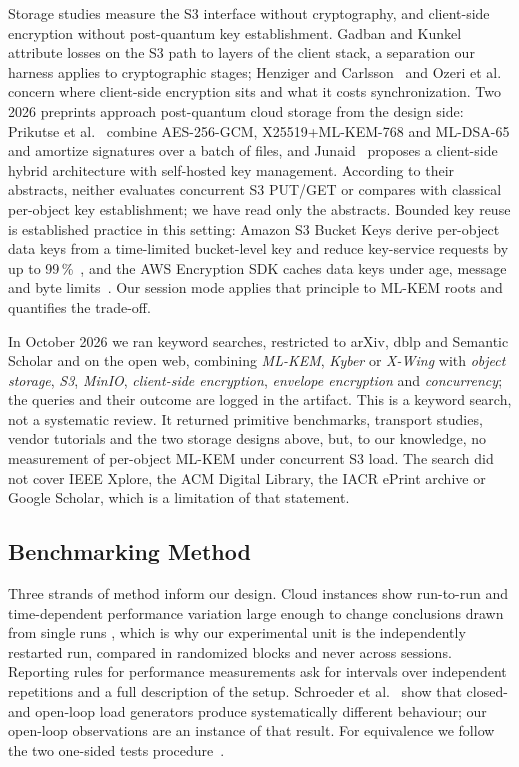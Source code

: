 \documentclass[conference]{IEEEtran}
\begin{document}
Storage studies measure the S3 interface without cryptography, and client-side encryption
without post-quantum key establishment. Gadban and Kunkel~\cite{gadban2021} attribute losses on
the S3 path to layers of the client stack, a separation our harness applies to cryptographic
stages; Henziger and Carlsson~\cite{henziger2019} and Ozeri et al.~\cite{ozeri2023} concern
where client-side encryption sits and what it costs synchronization. Two 2026 preprints
approach post-quantum cloud storage from the design side: Prikutse et
al.~\cite{prikutse2026} combine AES-256-GCM, X25519+ML-KEM-768 and ML-DSA-65 and amortize
signatures over a batch of files, and Junaid~\cite{junaid2026} proposes a client-side hybrid
architecture with self-hosted key management. According to their abstracts, neither evaluates
concurrent S3 PUT/GET or compares with classical per-object key establishment; we have read only
the abstracts. Bounded key reuse is established practice in this setting: Amazon S3 Bucket Keys
derive per-object data keys from a time-limited bucket-level key and reduce key-service requests
by up to 99\,\%~\cite{s3bucketkeys}, and the AWS Encryption SDK caches data keys under age,
message and byte limits~\cite{esdkcache}. Our session mode applies that principle to ML-KEM
roots and quantifies the trade-off.

In October 2026 we ran keyword searches, restricted to arXiv, dblp and Semantic Scholar and on
the open web, combining \emph{ML-KEM}, \emph{Kyber} or \emph{X-Wing} with \emph{object storage},
\emph{S3}, \emph{MinIO}, \emph{client-side encryption}, \emph{envelope encryption} and
\emph{concurrency}; the queries and their outcome are logged in the artifact. This is a keyword
search, not a systematic review. It returned primitive benchmarks, transport studies, vendor
tutorials and the two storage designs above, but, to our knowledge, no measurement of per-object
ML-KEM under concurrent S3 load. The search did not cover IEEE Xplore, the ACM Digital Library,
the IACR ePrint archive or Google Scholar, which is a limitation of that statement.

\subsection{Benchmarking Method}\label{sec:benchmethod}
Three strands of method inform our design. Cloud instances show run-to-run and time-dependent
performance variation large enough to change conclusions drawn from single runs
\cite{leitner2016,uta2020,maricq2018},
which is why our experimental unit is the independently restarted run, compared in randomized
blocks and never across sessions. Reporting rules for performance measurements
\cite{hoefler2015,kalibera2013}
ask for intervals over independent repetitions and a full description of the setup. Schroeder et
al.~\cite{schroeder2006} show that closed- and open-loop load generators produce systematically
different behaviour; our open-loop observations are an instance of that result. For equivalence
we follow the two one-sided tests procedure~\cite{schuirmann1987,lakens2017}.
\end{document}
